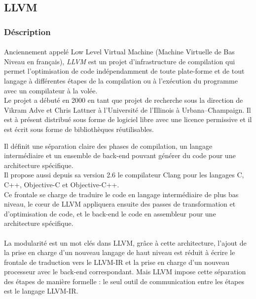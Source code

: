 \subsection{LLVM}
\subsubsection{Déscription}
\paragraph{}
Anciennement appelé \og{} Low Level Virtual Machine \fg{} (Machine Virtuelle de
Bas Niveau en français), \emph{LLVM} est un projet d'infrastructure de
compilation qui permet l'optimisation de code indépendamment de toute
plate-forme et de tout langage à différentes étapes de la compilation ou à
l'exécution du programme avec un compilateur à la volée.\\
Le projet a débuté en 2000 en tant que projet de recherche sous la direction de
Vikram Adve et Chris Lattner à l'Université de l'Illinois à Urbana–Champaign. Il
est à présent distribué sous forme de logiciel libre avec une licence permissive
et il est écrit sous forme de bibliothèques réutilisables.

Il définit une séparation claire des phases de compilation, un langage
intermédiaire et un ensemble de back-end pouvant générer du code pour une
architecture spécifique.\\
Il propose aussi depuis sa version 2.6 le compilateur Clang pour les langages C,
C++, Objective-C et Objective-C++.\\
Ce frontale se charge de traduire le code en langage intermédiaire de plus bas
niveau, le c\oe{}ur de LLVM appliquera ensuite des passes de transformation et
d'optimisation de code, et le back-end le code en assembleur pour une
architecture spécifique.

\paragraph{}
La modularité est un mot clés dans LLVM, grâce à cette architecture, l'ajout de
la prise en charge d'un nouveau langage de haut niveau est réduit à écrire le
frontale de traduction vers le LLVM-IR et la prise en charge d'un nouveau
processeur avec le back-end correspondant. Mais LLVM impose cette séparation des
étapes de manière formelle : le seul outil de communication entre les étapes est
le langage LLVM-IR.

